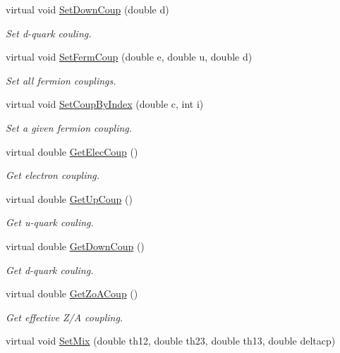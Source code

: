 \begin{DoxyCompactItemize}
virtual void \hyperlink{classOscProb_1_1PMNS__NSI_abcc85b0662bd6d08fc5a0bc713657129}{Set\+Down\+Coup} (double d)
\begin{DoxyCompactList}\small\item\em Set d-\/quark couling. \end{DoxyCompactList}\item 
virtual void \hyperlink{classOscProb_1_1PMNS__NSI_a78983619968493630c48080bea9af05e}{Set\+Ferm\+Coup} (double e, double u, double d)
\begin{DoxyCompactList}\small\item\em Set all fermion couplings. \end{DoxyCompactList}\item 
virtual void \hyperlink{classOscProb_1_1PMNS__NSI_a276d475bbebcdf24502a5555ee65b136}{Set\+Coup\+By\+Index} (double c, int i)
\begin{DoxyCompactList}\small\item\em Set a given fermion coupling. \end{DoxyCompactList}\item 
virtual double \hyperlink{classOscProb_1_1PMNS__NSI_adbee38997ab80f8d1a9750d3eae0afea}{Get\+Elec\+Coup} ()
\begin{DoxyCompactList}\small\item\em Get electron coupling. \end{DoxyCompactList}\item 
virtual double \hyperlink{classOscProb_1_1PMNS__NSI_a5fbeeb25bd00fbda7c484dbdb6748a58}{Get\+Up\+Coup} ()
\begin{DoxyCompactList}\small\item\em Get u-\/quark couling. \end{DoxyCompactList}\item 
virtual double \hyperlink{classOscProb_1_1PMNS__NSI_a4f5306674397d6183214d53bf2f110f7}{Get\+Down\+Coup} ()
\begin{DoxyCompactList}\small\item\em Get d-\/quark couling. \end{DoxyCompactList}\item 
virtual double \hyperlink{classOscProb_1_1PMNS__NSI_a42b2db6f2f42dbca7545a10d101a7950}{Get\+Zo\+A\+Coup} ()
\begin{DoxyCompactList}\small\item\em Get effective Z/A coupling. \end{DoxyCompactList}\item 
virtual void \hyperlink{classOscProb_1_1PMNS__Fast_ad849b2231d99c5d66fb3ade8efb896e1}{Set\+Mix} (double th12, double th23, double th13, double deltacp)

\end{DoxyCompactItemize}
